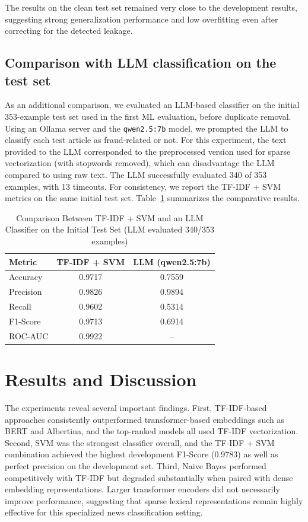 \documentclass[conference]{IEEEtran}
\begin{document}
The results on the clean test set remained very close to the development results, suggesting strong generalization performance and low overfitting even after correcting for the detected leakage.

\subsection{Comparison with LLM classification on the test set}

As an additional comparison, we evaluated an LLM-based classifier on the initial 353-example test set used in the first ML evaluation, before duplicate removal. Using an Ollama server and the \texttt{qwen2.5:7b} model, we prompted the LLM to classify each test article as fraud-related or not. For this experiment, the text provided to the LLM corresponded to the preprocessed version used for sparse vectorization (with stopwords removed), which can disadvantage the LLM compared to using raw text. The LLM successfully evaluated 340 of 353 examples, with 13 timeouts. For consistency, we report the TF-IDF + SVM metrics on the same initial test set. Table~\ref{tab:llm_vs_ml} summarizes the comparative results.

\begin{table}[h]
\caption{Comparison Between TF-IDF + SVM and an LLM Classifier on the Initial Test Set (LLM evaluated 340/353 examples)}
\label{tab:llm_vs_ml}
\centering
\begin{tabular}{lcc}
\toprule
Metric & TF-IDF + SVM & LLM (qwen2.5:7b) \\
\midrule
Accuracy & 0.9717 & 0.7559 \\
Precision & 0.9826 & 0.9894 \\
Recall & 0.9602 & 0.5314 \\
F1-Score & 0.9713 & 0.6914 \\
ROC-AUC & 0.9922 & -- \\
\bottomrule
\end{tabular}
\end{table}

\section{Results and Discussion}

The experiments reveal several important findings. First, TF-IDF-based approaches consistently outperformed transformer-based embeddings such as BERT and Albertina, and the top-ranked models all used TF-IDF vectorization. Second, SVM was the strongest classifier overall, and the TF-IDF + SVM combination achieved the highest development F1-Score (0.9783) as well as perfect precision on the development set. Third, Naive Bayes performed competitively with TF-IDF but degraded substantially when paired with dense embedding representations. Larger transformer encoders did not necessarily improve performance, suggesting that sparse lexical representations remain highly effective for this specialized news classification setting.
\end{document}
